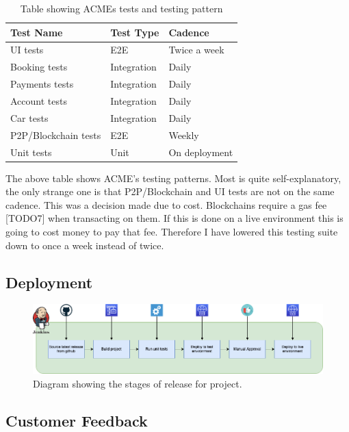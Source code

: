  \begin{table}[H]
    \centering
    \begin{tabular}{|l|l|l|}
      \hline
      \textbf{Test Name}    & \textbf{Test Type}  & \textbf{Cadence}  \\ \hline
      UI tests              & E2E                 & Twice a week      \\ \hline
      Booking tests         & Integration         & Daily             \\ \hline
      Payments tests        & Integration         & Daily             \\ \hline     
      Account tests         & Integration         & Daily             \\ \hline     
      Car tests             & Integration         & Daily             \\ \hline   
      P2P/Blockchain tests  & E2E                 & Weekly            \\ \hline 
      Unit tests            & Unit                & On deployment     \\ \hline    
    \end{tabular}
    \caption{Table showing ACMEs tests and testing pattern}
  \end{table}

  The above table shows ACME's testing patterns. Most is quite self-explanatory, the only strange one is that P2P/Blockchain and UI tests are not on 
  the same cadence. This was a decision made due to cost. Blockchains require a gas fee [TODO7] when transacting on them. If this is done on a live 
  environment this is going to cost money to pay that fee. Therefore I have lowered this testing suite down to once a week instead of twice.

  \subsection{Deployment}
  \label{sec:Deployment}

  \begin{figure}[H]
    \centering
    \includegraphics[width=12cm]{assets/relasePipeline.drawio.png}
    \caption{Diagram showing the stages of release for project.}
    \label{fig:releasePipeline}
  \end{figure}

  \subsection{Customer Feedback}

\newpage